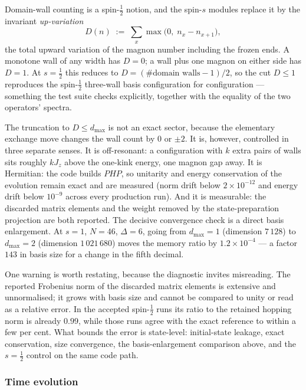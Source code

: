 Domain-wall counting is a spin-$\tfrac12$ notion, and the spin-$s$ modules
replace it by the invariant \emph{up-variation}
\begin{equation}
  D(n) \;:=\; \sum_x \max\bigl(0,\; n_x - n_{x+1}\bigr),
  \label{eq:num-upvariation}
\end{equation}
the total upward variation of the magnon number including the frozen ends. A
monotone wall of any width has $D=0$; a wall plus one magnon on either side
has $D=1$. At $s=\tfrac12$ this reduces to $D = (\#\text{domain walls}-1)/2$,
so the cut $D\leq 1$ reproduces the spin-$\tfrac12$ three-wall basis
configuration for configuration --- something the test suite checks
explicitly, together with the equality of the two operators' spectra.

The truncation to $D\leq d_{\max}$ is not an exact sector, because the
elementary exchange move changes the wall count by $0$ or $\pm2$. It is,
however, controlled in three separate senses. It is off-resonant: a
configuration with $k$ extra pairs of walls sits roughly $kJ_z$ above the
one-kink energy, one magnon gap away. It is Hermitian: the code builds
$PHP$, so unitarity and energy conservation of the evolution remain exact and
are measured (norm drift below $2\times10^{-12}$ and energy drift below
$10^{-9}$ across every production run). And it is measurable: the discarded
matrix elements and the weight removed by the state-preparation projection are
both reported. The decisive convergence check is a direct basis enlargement.
At $s=1$, $N=46$, $\Delta=6$, going from $d_{\max}=1$ (dimension $7\,128$) to
$d_{\max}=2$ (dimension $1\,021\,680$) moves the memory ratio by
$1.2\times10^{-4}$ --- a factor $143$ in basis size for a change in the fifth
decimal.

One warning is worth restating, because the diagnostic invites
misreading. The reported Frobenius norm of the discarded matrix elements is
extensive and unnormalised; it grows with basis size and cannot be compared to
unity or read as a relative error. In the accepted spin-$\tfrac12$ runs its
ratio to the retained hopping norm is already $0.99$, while those runs agree
with the exact reference to within a few per cent. What bounds the error is
state-level: initial-state leakage, exact conservation, size convergence, the
basis-enlargement comparison above, and the $s=\tfrac12$ control on the same
code path.

\subsubsection{Time evolution}

